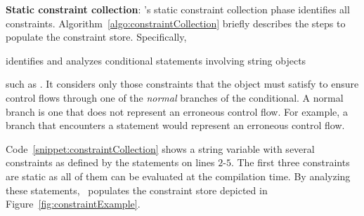 \begin{mylist}

 \item \textbf{Static constraint collection}: \tool's static constraint
collection phase identifies all constraints.
Algorithm~\ref{algo:constraintCollection} briefly describes the steps to
populate the constraint store. Specifically, \tool\  identifies and analyzes conditional statements involving string
objects  such as . It
considers only those constraints that the object must satisfy to ensure control
flows through one of the \textit{normal} branches of the conditional. A normal
branch is one that does not represent an erroneous control flow. For example, a
branch that encounters a statement  would represent an
erroneous control flow. 
% 
Code~\ref{snippet:constraintCollection} shows a string variable with several
constraints as defined by the  statements on lines $2$-$5$. The first
three constraints are static as all of them can be evaluated at the compilation
time. By analyzing these statements, \tool\ populates the constraint store
depicted in Figure~\ref{fig:constraintExample}. 

\begin{algorithm}[t]
\scriptsize
\DontPrintSemicolon
{}
\end{algorithm}
\end{mylist}
